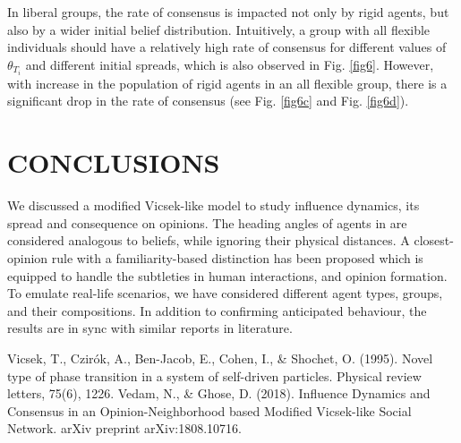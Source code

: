 \documentclass[letterpaper,english,11pt]{article}
\begin{document}
 In liberal groups, the rate of consensus is impacted not only by rigid agents, but also by a wider initial belief distribution. Intuitively, a group with all flexible individuals should have a relatively high rate of consensus for different values of $\theta_{T_{i}}$ and different initial spreads, which is also observed in Fig. \ref{fig6}. However, with increase in the population of rigid agents in an all flexible group, there is a significant drop in the rate of consensus (see Fig. \ref{fig6c} and Fig. \ref{fig6d}).
 
 \section{CONCLUSIONS}
 We discussed a modified Vicsek-like model to study influence dynamics, its spread and consequence on opinions. The heading angles of agents in \cite{vicsek1995novel} are considered analogous to beliefs, while ignoring their physical distances. A closest-opinion rule with a familiarity-based distinction has been proposed which is equipped to handle the subtleties in human interactions, and opinion formation. To emulate real-life scenarios, we have considered different agent types, groups, and their compositions. In addition to confirming anticipated behaviour, the results are in sync with similar reports in literature. 
 
\begin{thebibliography}{99}
	 Vicsek, T., Czirók, A., Ben-Jacob, E., Cohen, I., \& Shochet, O. (1995). Novel type of phase transition in a system of self-driven particles. Physical review letters, 75(6), 1226.
	 Vedam, N., \& Ghose, D. (2018). Influence Dynamics and Consensus in an Opinion-Neighborhood based Modified Vicsek-like Social Network. arXiv preprint arXiv:1808.10716.
	\end{thebibliography}
\end{document}
